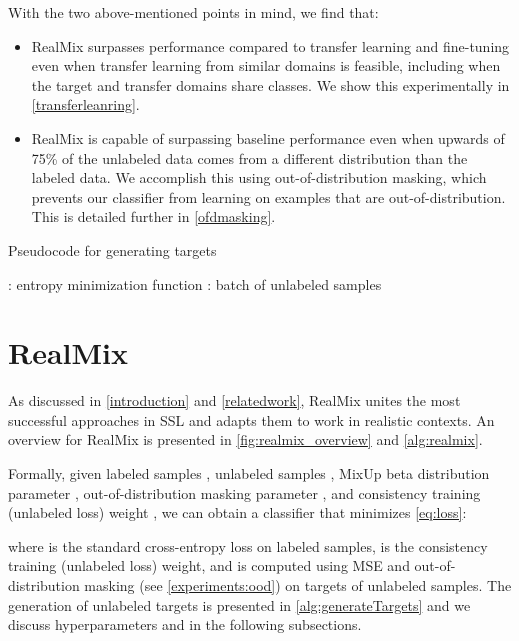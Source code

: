 \documentclass[10pt,twocolumn,letterpaper]{article}
\begin{document}
With the two above-mentioned points in mind, we find that: 
 \begin{itemize}
     \item RealMix surpasses performance compared to transfer learning and fine-tuning even when transfer learning from similar domains is feasible, including when the target and transfer domains share classes. We show this experimentally in \cref{transferleanring}.
     \item RealMix is capable of surpassing baseline performance even when upwards of 75\% of the unlabeled data comes from a different distribution than the labeled data. We accomplish this using out-of-distribution masking, which prevents our classifier from learning on examples that are out-of-distribution. This is detailed further in \cref{ofdmasking}.
 \end{itemize}
 



\begin{algorithm*}
\caption{Pseudocode for generating targets}
\label{alg:generateTargets}
\begin{algorithmic}[1]
\STATE \req : entropy minimization function
\STATE \req : batch of unlabeled samples
\STATE 
\STATE 
\STATE 
\STATE 
\STATE 
\STATE  \label{line:sharpening} \\
\RETURN 
\end{algorithmic}

\end{algorithm*}

\section{RealMix}

As discussed in \cref{introduction} and \ref{relatedwork}, RealMix unites the most successful approaches in SSL and adapts them to work in realistic contexts. An overview for RealMix is presented in \cref{fig:realmix_overview} and \cref{alg:realmix}.

Formally, given labeled samples , unlabeled samples , MixUp beta distribution parameter , out-of-distribution masking parameter , and consistency training (unlabeled loss) weight , we can obtain a classifier  that minimizes \cref{eq:loss}: 


where  is the standard cross-entropy loss on labeled samples,  is the consistency training (unlabeled loss) weight, and  is computed using MSE and out-of-distribution masking (see \cref{experiments:ood}) on targets of unlabeled samples. The generation of unlabeled targets is presented in \cref{alg:generateTargets} and we discuss hyperparameters  and  in the following subsections.
\end{document}
